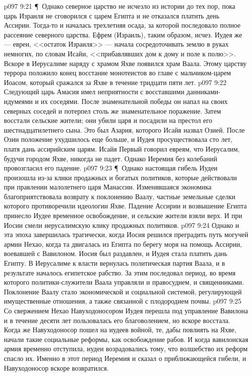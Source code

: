 \vs p097 9:21 \P\ Однако северное царство не исчезло из истории до тех пор, пока царь Израиля не сговорился с царем Египта и не отказался платить день Ассирии. Тогда\hyp{}то и началась трехлетняя осада, за которой последовало полное рассеяние северного царства. Ефрем (Израиль), таким образом, исчез. Иудея же --- евреи, <<остаток Израиля>> --- начала сосредоточивать землю в руках немногих, по словам Исайи, <<прибавлявших дом к дому и поле к полю>>. Вскоре в Иерусалиме наряду с храмом Яхве появился храм Ваала. Этому царству террора положило конец восстание монотеистов во главе с мальчиком\hyp{}царем Иоасом, который сражался за Яхве в течение тридцати пяти лет.
\vs p097 9:22 Следующий царь Амасия имел неприятности с восставшими данниками\hyp{}идумеями и их соседями. После знаменательной победы он напал на своих северных соседей и потерпел столь же знаменательное поражение. Затем восстали сельские жители; они убили царя и посадили на престол его шестнадцатилетнего сына. Это был Азария, которого Исайя назвал Озией. После Озии положение ухудшилось еще больше, и Иудея просуществовала сто лет, платя дань ассирийским царям. Исайя Первый говорил евреям, что Иерусалим, будучи городом Яхве, никогда не падет. Однако Иеремия без колебаний провозгласил его падение.
\vs p097 9:23 \P\ Однако настоящая гибель Иудеи произошла из\hyp{}за клики продажных и богатых политиков, которые действовали при правлении малолетнего царя Манассии. Изменявшаяся экономика благоприятствовала возврату к поклонению Ваалу, частные земельные сделки которого противоречили идеологии Яхве. Падение Ассирии и возвышение Египта принесло Иудее временное освобождение, и сельские жители взяли верх. И при Иосии смели иерусалимскую клику продажных политиков.
\vs p097 9:24 Однако и эта эпоха завершилась трагически, когда Иосия решился преградить путь могучей армии Нехао, когда та двигалась из Египта по берегу моря на помощь Ассирии, воевавшей с Вавилоном. Иосия был раздавлен, и Иудея стала платить дань Египту. В Иерусалиме к власти вернулась политическая партия Ваала, и в результате началось  египетское рабство. За этим последовал период, во время которого политики\hyp{}служители Ваала управляли и правосудием, и священниками. Поклонение Ваалу стало экономической и социальной системой, регулирующей имущественные отношения, а также связанной с плодородием почвы.
\vs p097 9:25 Со свержением Нехао Навуходоносором Иудея перешла под управление Вавилона и в течение десяти лет пользовалась его благоволением, но вскоре восстала. Когда же Навуходоносор пошел на иудеев войной, те, дабы повлиять на Яхве, начали такие социальные реформы, как освобождение рабов. И когда вавилонская армия временно отступила, иудеи возрадовались тому, что волшебство их реформ спасло их. Именно в этот период Иеремия и сказал о приближающейся гибели, и Навуходоносор вскоре возвратился.
